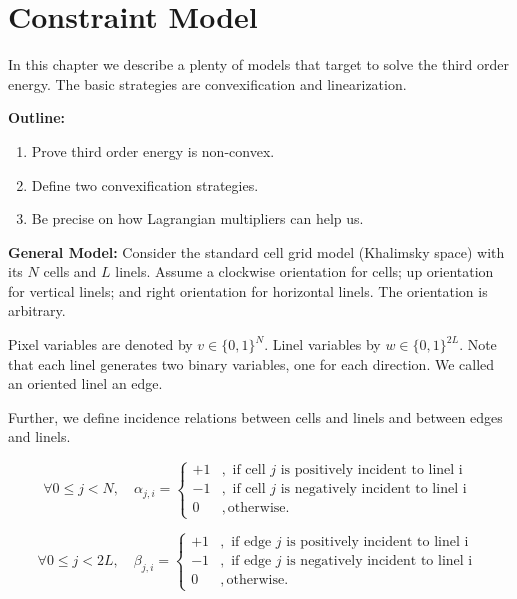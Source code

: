 \chapter{Constraint Model}
\label{chapter:appendix-constraint-model}

In this chapter we describe a plenty of models that target to solve the third order energy. The basic strategies are convexification and linearization.

\textbf{Outline:} 

\begin{enumerate}
	\item{Prove third order energy is non-convex.}
	\item{Define two convexification strategies.}
	\item{Be precise on how Lagrangian multipliers can help us.}
\end{enumerate}

\textbf{General Model:} 	Consider the standard cell grid model (Khalimsky space) with its $N$ cells and $L$ linels. Assume a clockwise orientation for cells; up orientation for vertical linels; and right orientation for horizontal linels. The orientation is arbitrary. 
	
	Pixel variables are denoted by $v \in \{0,1\}^N$. Linel variables by $w \in \{0,1\}^{2L}$. Note that each linel generates two binary variables, one for each direction. We called an oriented linel an edge.
			
	Further, we define incidence relations between cells and linels and between edges and linels.
	
	\[ \forall 0 \leq j < N, \quad
			\alpha_{j,i} = \left\{ 		\begin{array}{ll}
											+1&, \text{ if cell $j$ is positively incident to linel i }\\
											-1&,\text{ if cell $j$ is negatively incident to linel i }\\
											0&,\text{otherwise}.						
										\end{array}\right.
	\]
	
	\[\forall 0 \leq j < 2L, \quad
			\beta_{j,i} = \left\{ 		\begin{array}{ll}
											+1&, \text{ if edge $j$ is positively incident to linel i }\\
											-1&,\text{ if edge $j$ is negatively incident to linel i }\\
											0&,\text{otherwise}.						
										\end{array}\right.
	\]	

